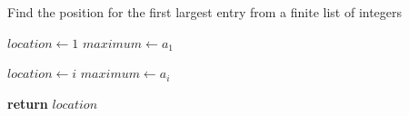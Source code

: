 \documentclass[a4paper, 12pt]{article}
\begin{document}
	
	\begin{algorithm}

		\renewcommand{\thealgorithm}{3.1.17}
		
		\caption{Find the position for the first largest entry from a finite list of integers}
		
		\begin{algorithmic}[1]
			
			
			\State $location \gets 1$
			\State $maximum \gets a_1$
			
					\State $location \gets i$
					\State $maximum \gets a_i$
				\EndIf
			\EndFor
			
			\State \textbf{return} $location$
			\EndProcedure
			
		\end{algorithmic}

	\end{algorithm}
\end{document}
